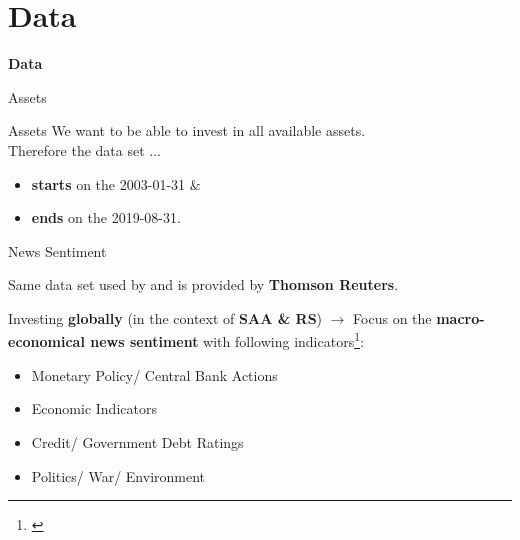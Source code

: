 
\section{Data}
\begin{frame}[noframenumbering]
	\begin{center}
	    \textbf{\huge{Data}}
	\end{center}
\end{frame}

\begin{frame}{Assets}

\end{frame}

\begin{frame}{Assets}
We want to be able to invest in all available assets. \\ \vspace{0.2cm} Therefore the data set ...
\vspace{0.4cm}
\begin{itemize}
    \item \textbf{starts} on the 2003-01-31 \&
    \item \textbf{ends} on the 2019-08-31.
\end{itemize}{}
\end{frame}

\begin{frame}{News Sentiment}

Same data set used by \citet{uhl2015s} and is provided by \textbf{Thomson Reuters}. 

\vspace{0.2cm}

Investing \textbf{globally} (in the context of \textbf{SAA \& RS}) $\rightarrow$ Focus on the \textbf{macro-economical news sentiment} with following indicators\footnote{\citep[p. 103]{uhl2015s}}:

\begin{itemize}
    \item Monetary Policy/ Central Bank Actions
    \item Economic Indicators
    \item Credit/ Government Debt Ratings
    \item Politics/ War/ Environment
\end{itemize}

\vspace{0.2cm}



\end{frame}

